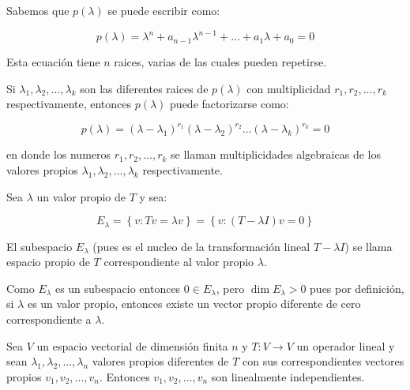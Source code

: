 		\begin{proposicion}
			Sabemos que $p(\lambda)$ se puede escribir como:

			\begin{equation}
				p(\lambda) = \lambda^n + a_{n-1} \lambda^{n-1} + \dots + a_1 \lambda + a_0 = 0
			\end{equation}

			Esta ecuación tiene $n$ raices, varias de las cuales pueden repetirse.

			Si $\lambda_1, \lambda_2, \dots, \lambda_k$ son las diferentes raices de $p(\lambda)$ con multiplicidad $r_1, r_2, \dots, r_k$ respectivamente, entonces $p(\lambda)$ puede factorizarse como:

			\begin{equation}
				p(\lambda) = (\lambda - \lambda_1)^{r_1} (\lambda - \lambda_2)^{r_2} \dots (\lambda - \lambda_k)^{r_k} = 0
			\end{equation}

			en donde los numeros $r_1, r_2, \dots, r_k$ se llaman multiplicidades algebraicas de los valores propios $\lambda_1, \lambda_2, \dots, \lambda_k$ respectivamente.

			Sea $\lambda$ un valor propio de $T$ y sea:

			\begin{equation}
				E_{\lambda} = \left\{ v \colon Tv = \lambda v \right\} = \left\{ v \colon (T - \lambda I) v = 0 \right\}
			\end{equation}

			El subespacio $E_{\lambda}$ (pues es el nucleo de la transformación lineal $T - \lambda I$) se llama espacio propio de $T$ correspondiente al valor propio $\lambda$.

			Como $E_\lambda$ es un subespacio entonces $0 \in E_{\lambda}$, pero $\dim{E_{\lambda}} > 0$ pues por definición, si $\lambda$ es un valor propio, entonces existe un vector propio diferente de cero correspondiente a $\lambda$.
		\end{proposicion}

		\begin{teorema}
			Sea $V$ un espacio vectorial de dimensión finita $n$ y $T \colon V \to V$ un operador lineal y sean $\lambda_1, \lambda_2, \dots, \lambda_n$ valores propios diferentes de $T$ con sus correspondientes vectores propios $v_1, v_2, \dots, v_n$.
			Entonces $v_1, v_2, \dots, v_n$ son linealmente independientes.
		\end{teorema}


